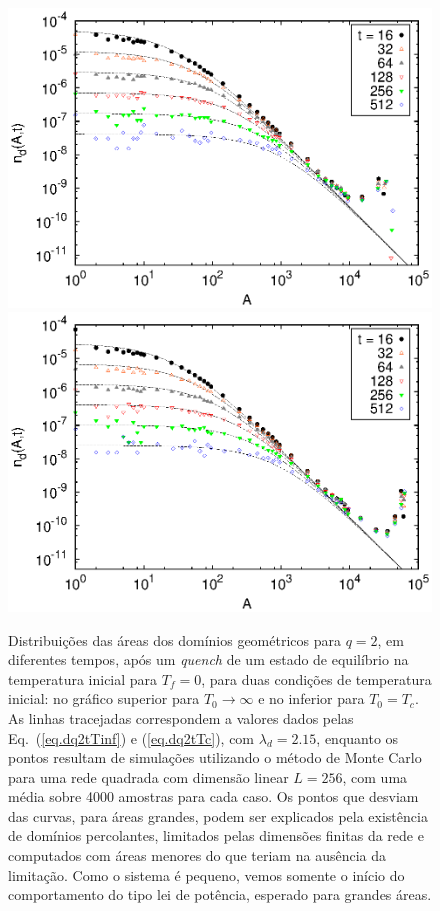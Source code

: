 \begin{figure}[h!]
 \centering
 \includegraphics[width=14cm]{fig/areas_q2_L256_Tinf_T0.eps} \\
 \includegraphics[width=14cm]{fig/areas_q2_L256_Tc_T0.eps}
 \caption{Distribuições das áreas dos domínios geométricos para $q=2$, em diferentes tempos, após um \textit{quench} de um estado de equilíbrio na temperatura inicial para $T_f=0$, para duas condições de temperatura inicial: no gráfico superior para $T_0 \rightarrow \infty$ e no inferior para $T_0 = T_c$. As linhas tracejadas correspondem a valores dados pelas Eq.~(\ref{eq.dq2tTinf}) e (\ref{eq.dq2tTc}), com $\lambda_d = 2.15$, enquanto os pontos resultam de simulações utilizando o método de Monte Carlo para uma rede quadrada com dimensão linear $L=256$, com uma média sobre 4000 amostras para cada caso. Os pontos que desviam das curvas, para áreas grandes, podem ser explicados pela existência de domínios percolantes, limitados pelas dimensões finitas da rede e computados com áreas menores do que teriam na ausência da limitação. Como o sistema é pequeno, vemos somente o início do comportamento do tipo lei de potência, esperado para grandes áreas.}
 \label{fig.areas_q2_L256}
\end{figure}


